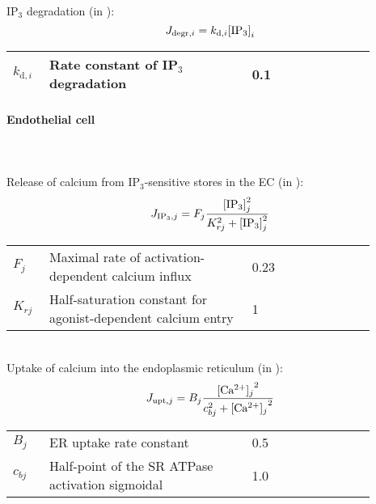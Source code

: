 \\
IP$_{3}$ degradation (in \uMs): 
\begin{equation} \label{eq:Jdegradi}
J_{\text{degr},i}= k_{\text{d},i}\text{[IP$_3$]}_i
\end{equation}
\begin{table}[h!]
\centering
\begin{tabular}{ p{0.09\linewidth}  >{\footnotesize} p{0.5\linewidth}  >{\footnotesize} p{0.27\linewidth} >{\footnotesize} p{0.03\linewidth} }
\hline
$k_{\text{d},i}$      			& Rate constant of IP$_{3}$ degradation	& 0.1 \pers	&\cite{Koenigsberger2006} \\
\hline
\end{tabular}
\label{tab:Jdegradi}
\end{table}
\paragraph{Endothelial cell}~\\
\\
%
Release of calcium from IP$_{3}$-sensitive stores in the EC (in \uMps):
\begin{equation} \label{eq:JIP3j}
J_{\text{IP}_3,j} = F_{j}\frac{\text{[IP$_3$]}_{j}^{2}}{K_{rj}^{2}+\text{[IP$_3$]}_{j}^{2}}
\end{equation}
\begin{table}[h!]
\centering
\begin{tabular}{ p{0.09\linewidth}  >{\footnotesize} p{0.5\linewidth}  >{\footnotesize} p{0.27\linewidth} >{\footnotesize} p{0.03\linewidth} }
\hline
 $F_{j}$      			& Maximal rate of activation-dependent calcium influx			& 0.23 \uMps				& \cite{Koenigsberger2006} \\
$K_{rj}$				& Half-saturation constant for agonist-dependent calcium entry	& 1 \uM					& \cite{Koenigsberger2006} \\
\hline
\end{tabular}
\label{tab:IP3j}
\end{table}
\\
%
Uptake of calcium into the endoplasmic reticulum (in \uMs):
\begin{equation} \label{eq:JERuptakej}
J_{\text{upt},j} = B_{j}\frac{\text{[Ca$^{2+}$]$_j$}^{2}}{c_{bj}^{2}+\text{[Ca$^{2+}$]$_j$}^{2}}
\end{equation}
%
\begin{table}[h!]
\centering
\begin{tabular}{ p{0.09\linewidth}  >{\footnotesize} p{0.5\linewidth}  >{\footnotesize} p{0.27\linewidth} >{\footnotesize} p{0.03\linewidth} }
\hline
$B_{j}$      			& ER uptake rate constant							& 0.5 \uMs				& \cite{Koenigsberger2006} \\
$c_{bj}$				& Half-point of the SR ATPase activation sigmoidal 	& 1.0 \uM					& \cite{Koenigsberger2006} \\
\hline
\end{tabular}
\label{tab:JERuptakej}
\end{table}
